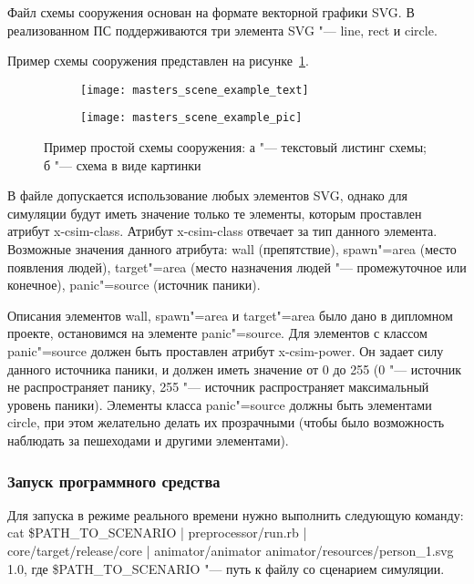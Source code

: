 Файл схемы сооружения основан на формате векторной графики SVG.
В реализованном ПС поддерживаются три элемента SVG "--- line, rect и circle.

Пример схемы сооружения представлен на рисунке~\ref{sec:manual:input:building_scheme:svg_listing}.

\begin{figure}[!ht]
  \centering
  \begin{subfigure}[!htb]{0.45\textwidth}
    \centering
    \texttt{[image: masters\_scene\_example\_text]}
    \caption{}
  \end{subfigure}
  \begin{subfigure}[!htb]{0.45\textwidth}
    \centering
    \texttt{[image: masters\_scene\_example\_pic]}
    \caption{}
  \end{subfigure}
  \caption{Пример простой схемы сооружения: а "--- текстовый листинг схемы;
           б "--- схема в виде картинки}
  \label{sec:manual:input:building_scheme:svg_listing}
\end{figure}

В файле допускается использование любых элементов SVG, однако для симуляции будут иметь значение только те элементы, которым проставлен атрибут x-csim-class.
Атрибут x-csim-class отвечает за тип данного элемента.  Возможные значения данного атрибута:
  wall (препятствие),
  spawn"=area (место появления людей),
  target"=area (место назначения людей "--- промежуточное или конечное),
  panic"=source (источник паники).

Описания элементов wall, spawn"=area и target"=area было дано в дипломном проекте, остановимся на элементе panic"=source.
Для элементов с классом panic"=source должен быть проставлен атрибут x-csim-power.
Он задает силу данного источника паники, и должен иметь значение от 0 до 255
(0 "--- источник не распространяет панику, 255 "--- источник распространяет максимальный уровень паники).
Элементы класса panic"=source должны быть элементами circle, при этом желательно делать их прозрачными
(чтобы было возможность наблюдать за пешеходами и другими элементами).

\subsubsection{Запуск программного средства}
\label{sec:manual:launch}

Для запуска в режиме реального времени нужно выполнить следующую команду:
cat \$PATH\_TO\_SCENARIO \-|\- preprocessor/run.rb \-|\- \\ core/target/release/core \-|\- animator/animator animator/resources/person\_1.svg 1.0,
где \$PATH\_TO\_SCENARIO "--- путь к файлу со сценарием симуляции.
